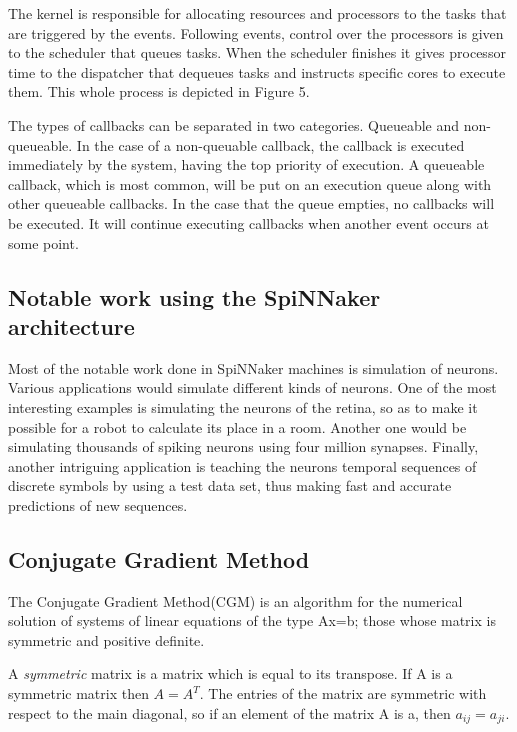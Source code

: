 \documentclass[12pt,twosided]{article}
\begin{document}
The kernel is responsible for allocating resources and processors to the tasks that are triggered by the events. Following events, control over the processors is given to the scheduler that queues tasks. When the scheduler finishes it gives processor time to the dispatcher that dequeues tasks and instructs specific cores to execute them. This whole process is depicted in Figure 5.

The types of callbacks can be separated in two categories. Queueable and non-queueable. In the case of a non-queuable callback, the callback is executed immediately by the system, having the top priority of execution. A queueable callback, which is most common, will be put on an execution queue along with other queueable callbacks. In the case that the queue empties, no callbacks will be executed. It will continue executing callbacks when another event occurs at some point\cite{sharp2011event}\cite{rast2012managing}. 
	
\subsection{Notable work using the SpiNNaker architecture}
Most of the notable work done in SpiNNaker machines is simulation of neurons. Various applications would simulate different kinds of neurons\cite{rast2012event}\cite{rast2011event}\cite{davies2011maintaining}\cite{jin2010algorithm}. One of the most interesting examples is simulating the neurons of the retina, so as to make it possible for a robot to calculate its place in a room\cite{davies2010interfacing}. Another one would be simulating thousands of spiking neurons using four million synapses\cite{sharp2012power}. Finally, another intriguing application is teaching the neurons temporal sequences  of discrete symbols by using a test data set, thus making fast and accurate predictions of new sequences\cite{bose2005spiking}.

\subsection{Conjugate Gradient Method}
The Conjugate Gradient Method(CGM) is an algorithm for the numerical solution of systems of linear equations of the type Ax=b; those whose matrix is symmetric and positive definite. 

A \emph{symmetric} matrix is a matrix which is equal to its transpose. If A is a symmetric matrix then $A=A^T$. The entries of the matrix are symmetric with respect to the main diagonal, so if an element of the matrix A is a, then $a_{ij}=a_{ji}$. 
\end{document}
